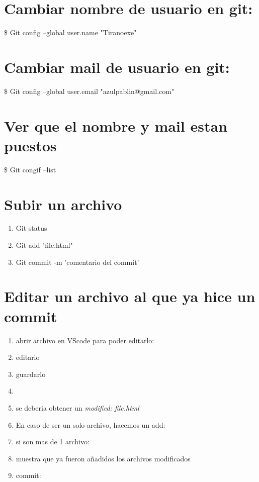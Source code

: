 \documentclass[]{article} %
\begin{document}
\section*{Cambiar nombre de usuario en git:}

\$ Git config --global user.name "Tiranoexe"

\section*{Cambiar mail de usuario en git:}
\$ Git config --global user.email "azulpablin@gmail.com"

\section*{Ver que el nombre y mail estan puestos}
\$ Git congif --list

\section*{Subir un archivo}
\begin{enumerate}
	\item Git status
	\item Git add "file.html"
	\item Git commit -m 'comentario del commit'
\end{enumerate}

\section*{Editar un archivo al que ya hice un commit}
\begin{enumerate}
	\item abrir archivo en VScode para poder editarlo: 
	\item editarlo
	\item guardarlo
	\item {}
	\item se deberia obtener un \textit{modified: file.html}
	\item En caso de ser un solo archivo, hacemos un add: 
	\item si son mas de 1 archivo: 
	\item {} muestra que ya fueron añadidos los archivos modificados
	\item commit: 
\end{enumerate}
\end{document}
